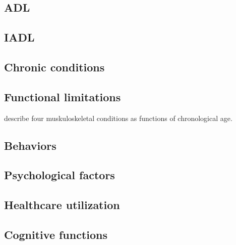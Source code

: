 \documentclass{article}
\begin{document}
\FloatBarrier
\pagebreak
\subsection{ADL}



\FloatBarrier
\subsection{IADL}

\FloatBarrier

\pagebreak
\subsection{Chronic conditions}


\FloatBarrier

\subsection{Functional limitations}


\citet{woolf2003burden} describe four muskuloskeletal conditions as functions of
chronological age.

\FloatBarrier

\subsection{Behaviors}

\FloatBarrier

\pagebreak
\subsection{Psychological factors}

\FloatBarrier

\subsection{Healthcare utilization}

\FloatBarrier

\pagebreak
\subsection{Cognitive functions}


\FloatBarrier

   
  
\pagebreak
\end{document}
